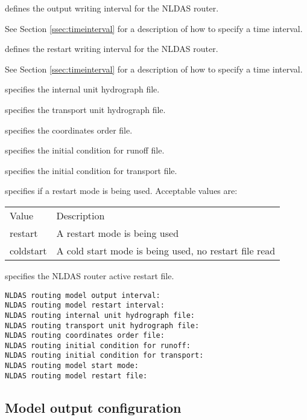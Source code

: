  
  defines the output
 writing interval for the NLDAS router.

 See Section \ref{ssec:timeinterval} for a description
 of how to specify a time interval.

  defines the restart
 writing interval for the NLDAS router.

 See Section \ref{ssec:timeinterval} for a description
 of how to specify a time interval.

  specifies the
 internal unit hydrograph file.

  specifies
 the transport unit hydrograph file.

  specifies the
 coordinates order file.

  specifies the
 initial condition for runoff file.

  specifies
 the initial condition for transport file.

  specifies if a restart mode is
 being used. 
 Acceptable values are:

 \begin{tabular}{ll}
 Value     & Description                                           \\
 restart   & A restart mode is being used                          \\
 coldstart & A cold start mode is being used, no restart file read \\
 \end{tabular}

  specifies the NLDAS router
 active restart file.
 

 \begin{Verbatim}[frame=single]
NLDAS routing model output interval:
NLDAS routing model restart interval:
NLDAS routing internal unit hydrograph file:
NLDAS routing transport unit hydrograph file:
NLDAS routing coordinates order file:
NLDAS routing initial condition for runoff:
NLDAS routing initial condition for transport:
NLDAS routing model start mode:
NLDAS routing model restart file:
 \end{Verbatim}

 
 \subsection{Model output configuration} \label{ssec:outputconfig}
 

